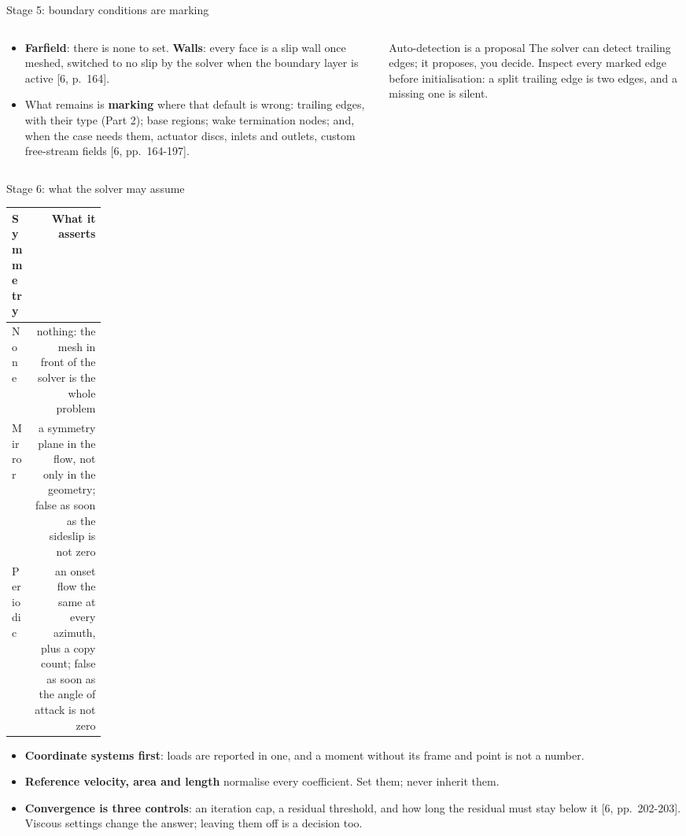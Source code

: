 \begin{frame}{Stage 5: boundary conditions are marking}
\begin{columns}[T]
\begin{column}{0.50\textwidth}
\begin{itemize}\small
  \item \textbf{Farfield}: there is none to set. \textbf{Walls}: every face is
        a slip wall once meshed, switched to no slip by the solver when the
        boundary layer is active [6, p.~164].
  \item What remains is \textbf{marking} where that default is wrong:
        trailing edges, with their type (Part 2); base regions; wake
        termination nodes; and, when the case needs them, actuator discs,
        inlets and outlets, custom free-stream fields [6, pp.~164-197].
\end{itemize}
\end{column}
\begin{column}{0.46\textwidth}
\begin{alertblock}{Auto-detection is a proposal}
\small The solver can detect trailing edges; it proposes, you decide. Inspect
every marked edge before initialisation: a split trailing edge is two edges,
and a missing one is silent.
\end{alertblock}
\end{column}
\end{columns}
\end{frame}

\begin{frame}{Stage 6: what the solver may assume}
\relax
{\ftstablesize\renewcommand{\arraystretch}{1.12}
\begin{tabularx}{\linewidth}{@{}P{0.14\linewidth}R@{}}
\toprule
\textbf{Symmetry} & \textbf{What it asserts} \\
\midrule
None & nothing: the mesh in front of the solver is the whole problem \\
Mirror & a symmetry plane in the flow, not only in the geometry; false as
  soon as the sideslip is not zero \\
Periodic & an onset flow the same at every azimuth, plus a copy count; false
  as soon as the angle of attack is not zero \\
\bottomrule
\end{tabularx}}
\vspace{1mm}
\begin{itemize}\small
  \item \textbf{Coordinate systems first}: loads are reported in one, and a
        moment without its frame and point is not a number.
  \item \textbf{Reference velocity, area and length} normalise every
        coefficient. Set them; never inherit them.
  \item \textbf{Convergence is three controls}: an iteration cap, a residual
        threshold, and how long the residual must stay below it
        [6, pp.~202-203]. Viscous settings change the answer; leaving them off
        is a decision too.
\end{itemize}
\end{frame}


